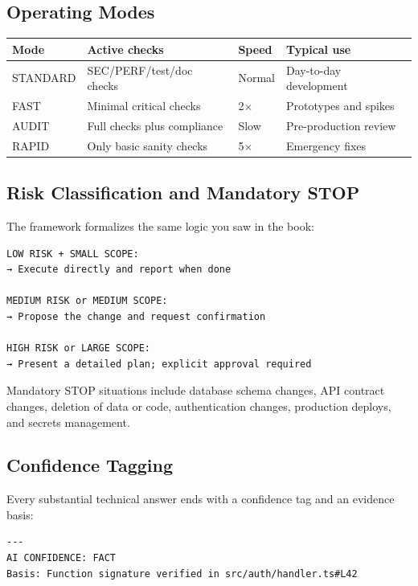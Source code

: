 \subsection{Operating Modes}

\begin{center}
\begin{tabularx}{\textwidth}{l l l X}
\toprule
\textbf{Mode} & \textbf{Active checks} & \textbf{Speed} & \textbf{Typical use} \\
\midrule
STANDARD & SEC/PERF/test/doc checks & Normal & Day-to-day development \\
FAST & Minimal critical checks & 2$\times$ & Prototypes and spikes \\
AUDIT & Full checks plus compliance & Slow & Pre-production review \\
RAPID & Only basic sanity checks & 5$\times$ & Emergency fixes \\
\bottomrule
\end{tabularx}
\end{center}

\subsection{Risk Classification and Mandatory STOP}

The framework formalizes the same logic you saw in the book:
\begin{lstlisting}[language={}]
LOW RISK + SMALL SCOPE:
→ Execute directly and report when done

MEDIUM RISK or MEDIUM SCOPE:
→ Propose the change and request confirmation

HIGH RISK or LARGE SCOPE:
→ Present a detailed plan; explicit approval required
\end{lstlisting}

Mandatory STOP situations include database schema changes, API contract changes, deletion of data or code, authentication changes, production deploys, and secrets management.

\subsection{Confidence Tagging}
Every substantial technical answer ends with a confidence tag and an evidence basis:
\begin{lstlisting}[language={}]
---
AI CONFIDENCE: FACT
Basis: Function signature verified in src/auth/handler.ts#L42
\end{lstlisting}

